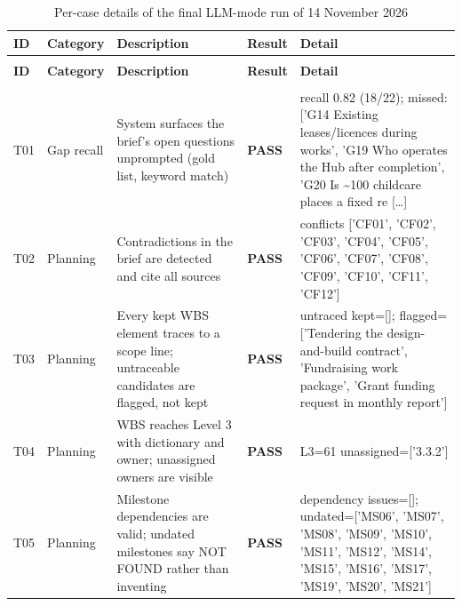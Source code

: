 {\footnotesize
\setlength{\tabcolsep}{3pt}
\renewcommand{\arraystretch}{1.15}
\begin{longtable}{@{}>{\raggedright\arraybackslash}p{0.75cm}>{\raggedright\arraybackslash}p{1.9cm}>{\raggedright\arraybackslash}p{4.2cm}>{\raggedright\arraybackslash}p{1.0cm}>{\raggedright\arraybackslash}p{6.9cm}@{}}
\caption{Per-case details of the final LLM-mode run of 14 November 2026}\label{tab:appllm}\\
\toprule
\textbf{ID} & \textbf{Category} & \textbf{Description} & \textbf{Result} & \textbf{Detail} \\
\midrule
\endfirsthead
\multicolumn{5}{@{}l}{\small\itshape Table~\thetable\ continued} \\
\toprule
\textbf{ID} & \textbf{Category} & \textbf{Description} & \textbf{Result} & \textbf{Detail} \\
\midrule
\endhead
\midrule
\multicolumn{5}{r@{}}{\small\itshape continued on next page} \\
\endfoot
\bottomrule
\endlastfoot
T01 & Gap recall & System surfaces the brief's open questions unprompted (gold list, keyword match) & \textbf{PASS} & {\ttfamily recall 0.82 (18/\allowbreak{}22); missed: ['G14 Existing leases/\allowbreak{}licences during works',\allowbreak{} 'G19 Who operates the Hub after completion',\allowbreak{} 'G20 Is \textasciitilde{}100 childcare places a fixed re} [\ldots] \\
T02 & Planning & Contradictions in the brief are detected and cite all sources & \textbf{PASS} & {\ttfamily conflicts ['CF01',\allowbreak{} 'CF02',\allowbreak{} 'CF03',\allowbreak{} 'CF04',\allowbreak{} 'CF05',\allowbreak{} 'CF06',\allowbreak{} 'CF07',\allowbreak{} 'CF08',\allowbreak{} 'CF09',\allowbreak{} 'CF10',\allowbreak{} 'CF11',\allowbreak{} 'CF12']} \\
T03 & Planning & Every kept WBS element traces to a scope line; untraceable candidates are flagged, not kept & \textbf{PASS} & {\ttfamily untraced kept=\allowbreak{}[]; flagged=\allowbreak{}['Tendering the design-and-build contract',\allowbreak{} 'Fundraising work package',\allowbreak{} 'Grant funding request in monthly report']} \\
T04 & Planning & WBS reaches Level 3 with dictionary and owner; unassigned owners are visible & \textbf{PASS} & {\ttfamily L3=\allowbreak{}61 unassigned=\allowbreak{}['3.3.2']} \\
T05 & Planning & Milestone dependencies are valid; undated milestones say NOT FOUND rather than inventing & \textbf{PASS} & {\ttfamily dependency issues=\allowbreak{}[]; undated=\allowbreak{}['MS06',\allowbreak{} 'MS07',\allowbreak{} 'MS08',\allowbreak{} 'MS09',\allowbreak{} 'MS10',\allowbreak{} 'MS11',\allowbreak{} 'MS12',\allowbreak{} 'MS14',\allowbreak{} 'MS15',\allowbreak{} 'MS16',\allowbreak{} 'MS17',\allowbreak{} 'MS19',\allowbreak{} 'MS20',\allowbreak{} 'MS21']} \\

\end{longtable}}
